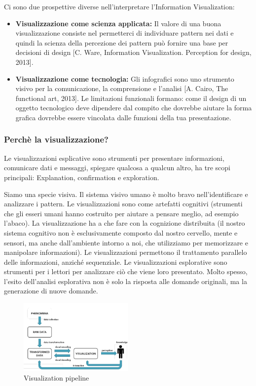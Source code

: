 Ci sono due prospettive diverse nell'interpretare l'Information Visualization:
\begin{itemize}
    \item  \textbf{Visualizzazione come scienza applicata:} Il valore di una buona visualizzazione consiste nel permetterci
     di individuare pattern nei dati e quindi la scienza della percezione dei pattern può fornire una 
     base per decisioni di design [C. Ware, Information Visualization. Perception for design, 2013].
    \item \textbf{Visualizzazione come tecnologia:}  Gli infografici sono uno strumento visivo per la comunicazione, la comprensione e l'analisi [A. Cairo, The functional art, 2013].
    Le limitazioni funzionali formano: come il design di un oggetto tecnologico deve dipendere dal compito che dovrebbe aiutare la forma grafica dovrebbe essere vincolata dalle funzioni della tua presentazione.
\end{itemize}
\subsubsection{Perchè la visualizzazione?}
Le visualizzazioni esplicative sono strumenti per presentare informazioni, comunicare dati e messaggi, 
spiegare qualcosa a qualcun altro, ha tre scopi principali: Explanation, confirmation e exploration.

Siamo una specie visiva. Il sistema visivo umano è molto bravo nell'identificare e analizzare i pattern.
Le visualizzazioni sono come artefatti cognitivi (strumenti che gli esseri umani hanno costruito per aiutare a pensare meglio, ad esempio l'abaco).
La visualizzazione ha a che fare con la cognizione distribuita (il nostro sistema cognitivo non è esclusivamente composto dal nostro cervello, 
mente e sensori, ma anche dall'ambiente intorno a noi, che utilizziamo per memorizzare e manipolare informazioni).
Le visualizzazioni permettono il trattamento parallelo delle informazioni, anziché sequenziale.
Le visualizzazioni esplorative sono strumenti per i lettori per analizzare ciò che
viene loro presentato. Molto spesso, l'esito dell'analisi esplorativa non è solo la risposta alle domande originali, ma la generazione di nuove domande.

\begin{figure}[H]
    \centering
    \includegraphics[width=0.5\textwidth]{images/visPipe.png} %
    \caption{Visualization pipeline}
    \label{fig:immagine}
\end{figure}
